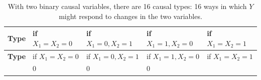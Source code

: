 \documentclass[12pt,]{book}
\begin{document}
\begin{longtable}[]{@{}cllll@{}}
\caption{\label{tab:PO16} With two binary causal variables, there are 16 causal types: 16 ways in which \(Y\) might respond to changes in the two variables.}\tabularnewline
\toprule
\begin{minipage}[b]{0.15\columnwidth}\centering
\textbf{Type}\strut
\end{minipage} & \begin{minipage}[b]{0.17\columnwidth}\raggedright
if \(X_1=X_2=0\)\strut
\end{minipage} & \begin{minipage}[b]{0.18\columnwidth}\raggedright
if \(X_1=0,X_2=1\)\strut
\end{minipage} & \begin{minipage}[b]{0.19\columnwidth}\raggedright
if \(X_1=1,X_2=0\)\strut
\end{minipage} & \begin{minipage}[b]{0.16\columnwidth}\raggedright
if \(X_1=X_2=1\)\strut
\end{minipage}\tabularnewline
\midrule
\endfirsthead
\toprule
\begin{minipage}[b]{0.15\columnwidth}\centering
\textbf{Type}\strut
\end{minipage} & \begin{minipage}[b]{0.17\columnwidth}\raggedright
if \(X_1=X_2=0\)\strut
\end{minipage} & \begin{minipage}[b]{0.18\columnwidth}\raggedright
if \(X_1=0,X_2=1\)\strut
\end{minipage} & \begin{minipage}[b]{0.19\columnwidth}\raggedright
if \(X_1=1,X_2=0\)\strut
\end{minipage} & \begin{minipage}[b]{0.16\columnwidth}\raggedright
if \(X_1=X_2=1\)\strut
\end{minipage}\tabularnewline
\midrule
\endhead
\begin{minipage}[t]{0.15\columnwidth}\centering
1\strut
\end{minipage} & \begin{minipage}[t]{0.17\columnwidth}\raggedright
0\strut
\end{minipage} & \begin{minipage}[t]{0.18\columnwidth}\raggedright
0\strut
\end{minipage} & \begin{minipage}[t]{0.19\columnwidth}\raggedright
0\strut
\end{minipage} & \begin{minipage}[t]{0.16\columnwidth}\raggedright

\end{minipage}
\end{longtable}
\end{document}
